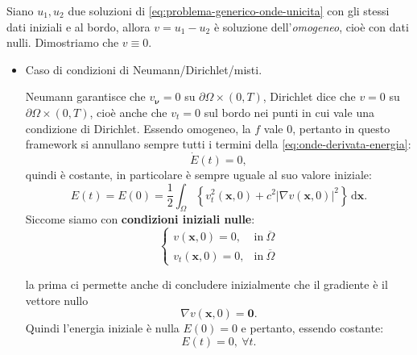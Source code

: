 \documentclass[10pt,a4paper,twoside,openright]{book}
\newcommand{\x}{\mathbf{x}}
\newcommand{\zer}{\mathbf{0}}
\newcommand{\de}{\,\mathrm d}
\newcommand{\dxx}{\de \x}
\begin{document}
\begin{dimostrazione}
    Siano $u_{1} ,u_{2}$ due soluzioni di \eqref{eq:problema-generico-onde-unicita} con gli stessi dati iniziali e al bordo, allora $v=u_{1} -u_{2}$ è soluzione dell'\textit{omogeneo}, cioè con dati nulli. Dimostriamo che $v\equiv 0$.
    \begin{itemize}
        \item Caso di condizioni di Neumann/Dirichlet/misti.

              Neumann garantisce che $v_{\bm{\nu }} =0$ su $\partial \Omega \times (0,T)$, Dirichlet dice che $v=0$ su $\partial \Omega \times (0,T)$, cioè anche che $v_{t} =0$ sul bordo nei punti in cui vale una condizione di Dirichlet. Essendo omogeneo, la $f$ vale $0$, pertanto in questo framework si annullano sempre tutti i termini della \eqref{eq:onde-derivata-energia}:
              \begin{equation*}
                  \dot{E}(t) =0,
              \end{equation*}quindi è costante, in particolare è sempre uguale al suo valore iniziale:
              \begin{equation*}
                  E(t) =E(0) =\frac{1}{2}\int _{\Omega }\left\{v_{t}^{2}(\x ,0) +c^{2}| \nabla v(\x ,0)| ^{2}\right\} \dxx .
              \end{equation*}Siccome siamo con \textbf{condizioni iniziali nulle}:
              \begin{equation*}
                  \begin{cases}
                      v(\x ,0) =0,     & \text{in} \ \overline{\Omega } \\
                      v_{t}(\x ,0) =0, & \text{in} \ \overline{\Omega }
                  \end{cases}
              \end{equation*}

              la prima ci permette anche di concludere inizialmente che il gradiente è il vettore nullo
              \begin{equation*}
                  \nabla v(\x ,0) =\zer .
              \end{equation*}Quindi l'energia iniziale è nulla $E(0) =0$ e pertanto, essendo costante:
              \begin{equation*}
                  E(t) =0,\ \forall t.
              \end{equation*}


\end{itemize}
\end{dimostrazione}
\end{document}

